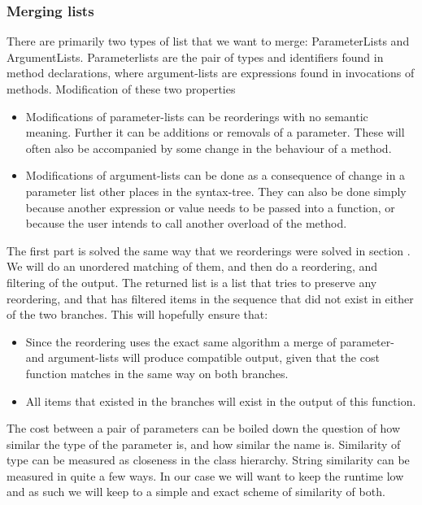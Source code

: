 \documentclass[11pt]{article}
\begin{document}
\subsubsection{Merging lists}
There are primarily two types of list that we want to merge: ParameterLists and ArgumentLists. Parameterlists are the pair of types and identifiers found in method declarations, where argument-lists are expressions found in invocations of methods. Modification of these two properties 

\begin{itemize}
   \item Modifications of parameter-lists can be reorderings with no semantic meaning. Further it can be additions or removals of a parameter. These will often also be accompanied by some change in the behaviour of a method.
   \item Modifications of argument-lists can be done as a consequence of change in a parameter list other places in the syntax-tree. They can also be done simply because another expression or value needs to be passed into a function, or because the user intends to call another overload of the method.
\end{itemize}

The first part is solved the same way that we reorderings were solved in section . We will do an unordered matching of them, and then do a reordering, and filtering of the output. The returned list is a list that tries to preserve any reordering, and that has filtered items in the sequence that did not exist in either of the two branches. This will hopefully ensure that:

\begin{itemize}
   \item Since the reordering uses the exact same algorithm a merge of parameter- and argument-lists will produce compatible output, given that the cost function matches in the same way on both branches.
   \item All items that existed in the branches will exist in the output of this function. 
\end{itemize}
The cost between a pair of parameters can be boiled down the question of how similar the type of the parameter is, and how similar the name is. Similarity of type can be measured as closeness in the class hierarchy. String similarity can be measured in quite a few ways. In our case we will want to keep the runtime low and as such we will keep to a simple and exact scheme of similarity of both.
\end{document}

